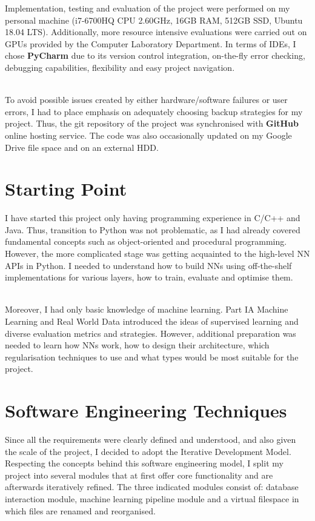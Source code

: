 Implementation, testing and evaluation of the project were performed on my personal machine (i7-6700HQ CPU 2.60GHz, 16GB RAM, 512GB SSD,  Ubuntu 18.04 LTS). Additionally, more resource intensive evaluations were carried out on GPUs provided by the Computer Laboratory Department. In terms of IDEs, I chose \textbf{PyCharm} due to its version control integration, on-the-fly error checking, debugging capabilities, flexibility and easy project navigation. \\\

To avoid possible issues created by either hardware/software failures or user errors, I had to place emphasis on adequately choosing backup strategies for my project. Thus, the git repository of the project was synchronised with \textbf{GitHub} online hosting service. The code was also occasionally updated on my Google Drive file space and on an external HDD. \\

\section{Starting Point}

I have started this project only having programming experience in C/C++ and Java. Thus, transition to Python was not problematic, as I had already covered fundamental concepts such as object-oriented and procedural programming. However, the more complicated stage was getting acquainted to the high-level NN APIs in Python. I needed to understand how to build NNs using off-the-shelf implementations for various layers, how to train, evaluate and optimise them. \\\

Moreover, I had only basic knowledge of machine learning. Part IA Machine Learning and Real World Data introduced the ideas of supervised learning and diverse evaluation metrics and strategies. However, additional preparation was needed to learn how NNs work, how to design their architecture, which regularisation techniques to use and what types would be most suitable for the project. \\

\section{Software Engineering Techniques}

Since all the requirements were clearly defined and understood, and also given the scale of the project, I decided to adopt the Iterative Development Model. Respecting the concepts behind this software engineering model, I split my project into several modules that at first offer core functionality and are afterwards iteratively refined. The three indicated modules
consist of: database interaction module, machine learning pipeline module and a virtual filespace in which files are renamed and reorganised. \\\

